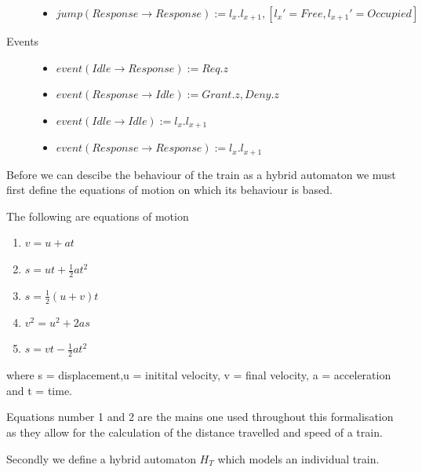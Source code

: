 \begin{mydef}
\begin{description}
\begin{itemize}
	\item $jump(Response \to Response) := l_x. l_{x+1} , [l_x' = Free, l_{x+1}' = Occupied]$


	\end{itemize}

\item[Events] \hspace*{0mm}
\begin{itemize}
	\item $event (Idle \to Response) := Req.z$
	\item $event(Response \to Idle) :={Grant.z,Deny.z}$
	\item $event(Idle \to Idle) := l_x.l_{x+1}$
	\item $event(Response \to Response) := l_x.l_{x+1}$	
\end{itemize}

\end{description}
\end{mydef} 
Before we can descibe the behaviour of the train as a hybrid automaton we must first define the equations of motion on which its behaviour is based.

\begin{mydef}
The following are equations of motion
\begin{enumerate}
\item $v = u +at$
\item $s = ut + \frac{1}{2}at^2$
\item $s = \frac{1}{2}(u + v)t$
\item $v^2 = u^2 +2as$
\item $s = vt - \frac{1}{2}at^2$
\end{enumerate}
where s = displacement,u = initital velocity, v = final velocity, a = acceleration and t = time.
\end{mydef}

Equations number 1 and 2 are the mains one used throughout this formalisation as they allow for the calculation of the distance travelled and speed of a train.

Secondly we define a hybrid automaton $H_{T}$ which models an individual train. 

